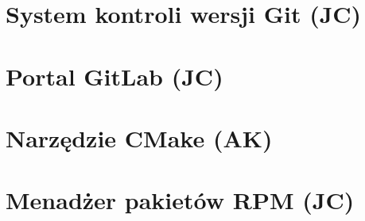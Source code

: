 \section{System kontroli wersji Git (JC)} %
\section{Portal GitLab (JC)}

\section{Narzędzie CMake (AK)}


\section{Menadżer pakietów RPM (JC)}

